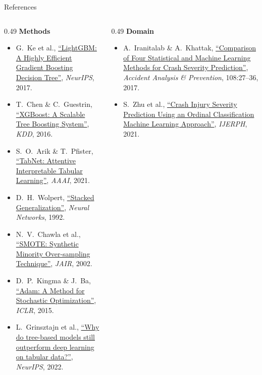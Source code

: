 \begin{frame}{References}
  \scriptsize
  \begin{columns}[T]
    \begin{column}{0.49\textwidth}
      \textbf{\color{astramInk}Methods}
      \begin{itemize}\itemsep2pt
        \item G.\ Ke et al., \href{https://papers.nips.cc/paper/6907-lightgbm-a-highly-efficient-gradient-boosting-decision-tree}{``LightGBM: A Highly Efficient Gradient Boosting Decision Tree''}, \emph{NeurIPS}, 2017.
        \item T.\ Chen \& C.\ Guestrin, \href{https://arxiv.org/abs/1603.02754}{``XGBoost: A Scalable Tree Boosting System''}, \emph{KDD}, 2016.
        \item S.\ O.\ Arik \& T.\ Pfister, \href{https://arxiv.org/abs/1908.07442}{``TabNet: Attentive Interpretable Tabular Learning''}, \emph{AAAI}, 2021.
        \item D.\ H.\ Wolpert, \href{https://doi.org/10.1016/S0893-6080(05)80023-1}{``Stacked Generalization''}, \emph{Neural Networks}, 1992.
        \item N.\ V.\ Chawla et al., \href{https://doi.org/10.1613/jair.953}{``SMOTE: Synthetic Minority Over-sampling Technique''}, \emph{JAIR}, 2002.
        \item D.\ P.\ Kingma \& J.\ Ba, \href{https://arxiv.org/abs/1412.6980}{``Adam: A Method for Stochastic Optimization''}, \emph{ICLR}, 2015.
        \item L.\ Grinsztajn et al., \href{https://arxiv.org/abs/2207.08815}{``Why do tree-based models still outperform deep learning on tabular data?''}, \emph{NeurIPS}, 2022.
      \end{itemize}
    \end{column}
    \begin{column}{0.49\textwidth}
      \textbf{\color{astramInk}Domain}
      \begin{itemize}\itemsep2pt
        \item A.\ Iranitalab \& A.\ Khattak, \href{https://doi.org/10.1016/j.aap.2017.08.008}{``Comparison of Four Statistical and Machine Learning Methods for Crash Severity Prediction''}, \emph{Accident Analysis \& Prevention}, 108:27--36, 2017.
        \item S.\ Zhu et al., \href{https://doi.org/10.3390/ijerph182111564}{``Crash Injury Severity Prediction Using an Ordinal Classification Machine Learning Approach''}, \emph{IJERPH}, 2021.

\end{itemize}
\end{column}
\end{columns}
\end{frame}
